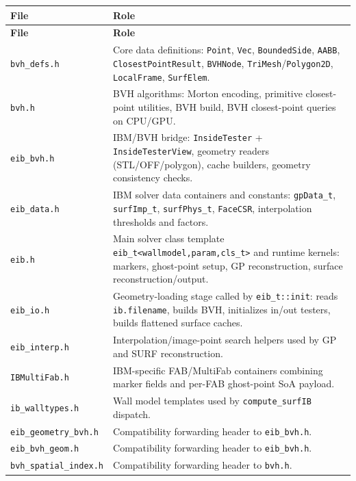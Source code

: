 \documentclass[11pt,a4paper]{article}
\begin{document}
\renewcommand{\arraystretch}{1.2}
\begin{longtable}{@{}L{3.5cm}L{10.2cm}@{}}
\toprule
\textbf{File} & \textbf{Role} \\
\midrule
\endfirsthead
\toprule
\textbf{File} & \textbf{Role} \\
\midrule
\endhead
\texttt{bvh\_defs.h} & Core data definitions: \texttt{Point}, \texttt{Vec}, \texttt{BoundedSide}, \texttt{AABB}, \texttt{ClosestPointResult}, \texttt{BVHNode}, \texttt{TriMesh}/\texttt{Polygon2D}, \texttt{LocalFrame}, \texttt{SurfElem}. \\
\texttt{bvh.h} & BVH algorithms: Morton encoding, primitive closest-point utilities, BVH build, BVH closest-point queries on CPU/GPU. \\
\texttt{eib\_bvh.h} & IBM/BVH bridge: \texttt{InsideTester} + \texttt{InsideTesterView}, geometry readers (STL/OFF/polygon), cache builders, geometry consistency checks. \\
\texttt{eib\_data.h} & IBM solver data containers and constants: \texttt{gpData\_t}, \texttt{surfImp\_t}, \texttt{surfPhys\_t}, \texttt{FaceCSR}, interpolation thresholds and factors. \\
\texttt{eib.h} & Main solver class template \texttt{eib\_t<wallmodel,param,cls\_t>} and runtime kernels: markers, ghost-point setup, GP reconstruction, surface reconstruction/output. \\
\texttt{eib\_io.h} & Geometry-loading stage called by \texttt{eib\_t::init}: reads \texttt{ib.filename}, builds BVH, initializes in/out testers, builds flattened surface caches. \\
\texttt{eib\_interp.h} & Interpolation/image-point search helpers used by GP and SURF reconstruction. \\
\texttt{IBMultiFab.h} & IBM-specific FAB/MultiFab containers combining marker fields and per-FAB ghost-point SoA payload. \\
\texttt{ib\_walltypes.h} & Wall model templates used by \texttt{compute\_surfIB} dispatch. \\
\texttt{eib\_geometry\_bvh.h} & Compatibility forwarding header to \texttt{eib\_bvh.h}. \\
\texttt{eib\_bvh\_geom.h} & Compatibility forwarding header to \texttt{eib\_bvh.h}. \\
\texttt{bvh\_spatial\_index.h} & Compatibility forwarding header to \texttt{bvh.h}. \\
\bottomrule
\end{longtable}
\end{document}
